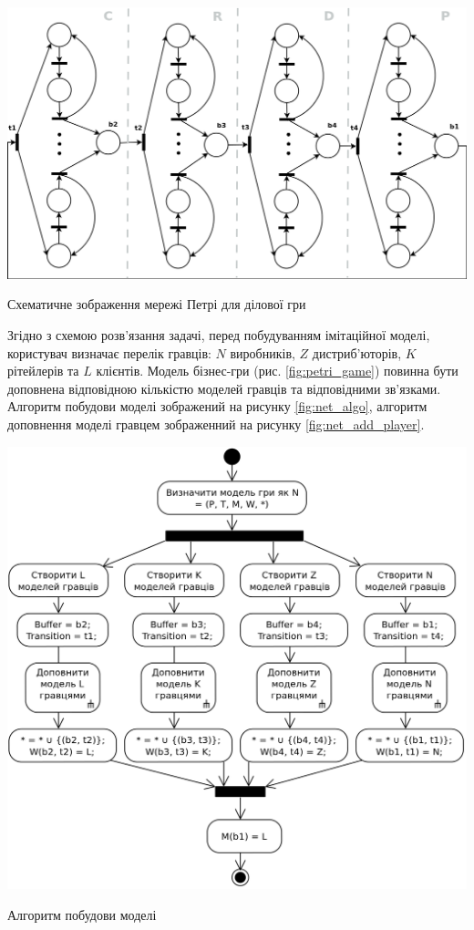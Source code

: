 \begin{stdfigure}  
    \includegraphics[width=7in]{images/big_petri_net.png}
    \caption{Схематичне зображення мережі Петрі для ділової гри}
    \label{fig:petri_game}
\end{stdfigure}
Згідно з схемою розв’язання задачі, перед побудуванням імітаційної моделі, користувач визначає перелік гравців: $N$ виробників, $Z$ дистриб’юторів, $K$ рітейлерів та $L$ клієнтів. Модель бізнес-гри (рис. \ref{fig:petri_game}) повинна бути доповнена відповідною кількістю моделей гравців та відповідними зв’язками. Алгоритм побудови моделі зображений на рисунку \ref{fig:net_algo}, алгоритм доповнення моделі гравцем зображенний на рисунку \ref{fig:net_add_player}.
\begin{stdfigure}  
    \includegraphics[width=5.5in]{images/algo.png}
    \caption{Алгоритм побудови моделі}
    \label{fig:net_algo}
\end{stdfigure}
